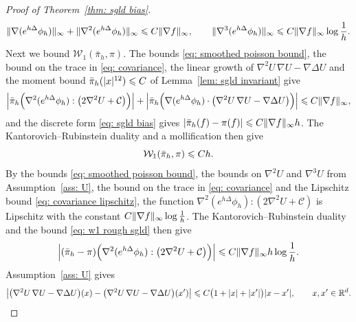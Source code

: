 \begin{proof}[Proof of Theorem~\ref{thm: sgld bias}]
    \begin{equation}
        \lVert \nabla ( e^{h\Delta} \phi_h ) \rVert_\infty + \lVert \nabla^2 ( e^{h\Delta} \phi_h ) \rVert_\infty \leqslant C \lVert \nabla f \rVert_\infty , \qquad \lVert \nabla^3 ( e^{h\Delta} \phi_h ) \rVert_\infty \leqslant C \lVert \nabla f \rVert_\infty \log\frac1h .
        \label{eq: smoothed poisson bound}
    \end{equation}
    Next we bound $\mathcal W_1(\bar\pi_h, \pi)$. The bounds \eqref{eq: smoothed poisson bound}, the bound on the trace in \eqref{eq: covariance}, the linear growth of $\nabla^2 U\, \nabla U - \nabla \Delta U$ and the moment bound $\bar\pi_h(|x|^{12}) \leqslant C$ of Lemma~\ref{lem: sgld invariant} give
    \begin{equation*}
        \Bigl| \bar\pi_h\Bigl( \nabla^2 ( e^{h\Delta} \phi_h ) : \bigl( 2\nabla^2 U + \mathcal C \bigr) \Bigr) \Bigr| + \Bigl| \bar\pi_h\Bigl( \nabla ( e^{h\Delta} \phi_h ) \cdot \bigl( \nabla^2 U\, \nabla U - \nabla \Delta U \bigr) \Bigr) \Bigr| \leqslant C \lVert \nabla f \rVert_\infty ,
    \end{equation*}
    and the discrete form \eqref{eq: sgld bias} gives $|\bar\pi_h(f) - \pi(f)| \leqslant C \lVert \nabla f \rVert_\infty h$. The Kantorovich--Rubinstein duality and a mollification then give
    \begin{equation}
        \mathcal W_1(\bar\pi_h, \pi) \leqslant C h .
        \label{eq: w1 rough sgld}
    \end{equation}
    By the bounds \eqref{eq: smoothed poisson bound}, the bounds on $\nabla^2 U$ and $\nabla^3 U$ from Assumption~\ref{ass: U}, the bound on the trace in \eqref{eq: covariance} and the Lipschitz bound \eqref{eq: covariance lipschitz}, the function $\nabla^2 ( e^{h\Delta} \phi_h ) : ( 2\nabla^2 U + \mathcal C )$ is Lipschitz with the constant $C \lVert \nabla f \rVert_\infty \log\frac1h$. The Kantorovich--Rubinstein duality and the bound \eqref{eq: w1 rough sgld} then give
    \begin{equation}
        \Bigl| ( \bar\pi_h - \pi )\Bigl( \nabla^2 ( e^{h\Delta} \phi_h ) : \bigl( 2\nabla^2 U + \mathcal C \bigr) \Bigr) \Bigr| \leqslant C \lVert \nabla f \rVert_\infty h \log\frac1h .
        \label{eq: sgld hessian transfer}
    \end{equation}
    Assumption~\ref{ass: U} gives
    \begin{equation}
        \bigl| \bigl( \nabla^2 U\, \nabla U - \nabla \Delta U \bigr)(x) - \bigl( \nabla^2 U\, \nabla U - \nabla \Delta U \bigr)(x') \bigr| \Le C \bigl( 1 + |x| + |x'| \bigr) |x - x'| , \qquad x, x' \in \mathbb R^d .
        \label{eq: drift correction lipschitz}

\end{equation}
\end{proof}
